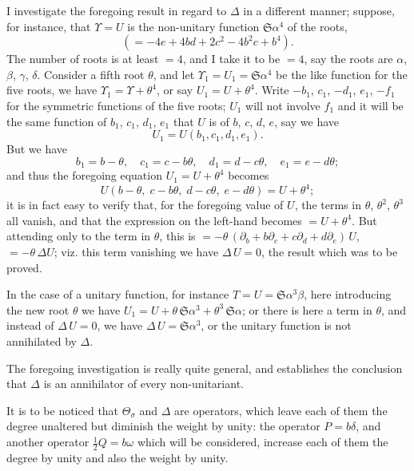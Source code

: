 \documentclass[11pt,a4paper]{book}
\begin{document}
\setcounter{art}{23}
\begin{art}
I investigate the foregoing result in regard to $\Delta$ in a different manner; suppose, for instance, that $\Upsilon = U$ is the non-unitary function $\mathfrak{S}\alpha^{4}$ of the roots,
\[
(= -4e + 4bd + 2c^{2} - 4b^{2}c + b^{4}).
\]
The number of roots is at least $= 4$, and I take it to be $= 4$, say the roots are $\alpha$, $\beta$, $\gamma$, $\delta$. Consider a fifth root $\theta$, and let $\Upsilon_{1} = U_{1} = \mathfrak{S}\alpha^{4}$ be the like function for the five roots, we have $\Upsilon_{1} = \Upsilon + \theta^{4}$, or say $U_{1} = U + \theta^{4}$. Write $-b_{1}$, $c_{1}$, $-d_{1}$, $e_{1}$, $-f_{1}$ for the symmetric functions of the five roots; $U_{1}$ will not involve $f_{1}$ and it will be the same function of $b_{1}$, $c_{1}$, $d_{1}$, $e_{1}$ that $U$ is of $b$, $c$, $d$, $e$, say we have
\[
U_{1} = U(b_{1}, c_{1}, d_{1}, e_{1}).
\]
But we have
\[
b_{1} = b - \theta,\quad c_{1} = c - b\theta,\quad d_{1} = d - c\theta,\quad e_{1} = e - d\theta;
\]
and thus the foregoing equation $U_{1} = U + \theta^{4}$ becomes
\[
U(b - \theta,\; c - b\theta,\; d - c\theta,\; e - d\theta) = U + \theta^{4};
\]
it is in fact easy to verify that, for the foregoing value of $U$, the terms in $\theta$, $\theta^{2}$, $\theta^{3}$ all vanish, and that the expression on the left-hand becomes $= U + \theta^{4}$. But attending only to the term in $\theta$, this is $= -\theta\,(\partial_{b} + b\partial_{c} + c\partial_{d} + d\partial_{e})\,U$, $= -\theta\,\Delta U$; viz. this term vanishing we have $\Delta\,U = 0$, the result which was to be proved.

In the case of a unitary function, for instance $T = U = \mathfrak{S}\alpha^{3}\beta$, here introducing the new root $\theta$ we have $U_{1} = U + \theta\,\mathfrak{S}\alpha^{3} + \theta^{3}\,\mathfrak{S}\alpha$; or there is here a term in $\theta$, and instead of $\Delta\,U = 0$, we have $\Delta\,U = \mathfrak{S}\alpha^{3}$, or the unitary function is not annihilated by $\Delta$.

The foregoing investigation is really quite general, and establishes the conclusion that $\Delta$ is an annihilator of every non-unitariant.

It is to be noticed that $\Theta_{\sigma}$ and $\Delta$ are operators, which leave each of them the degree unaltered but diminish the weight by unity: the operator $P = b\delta$, and another operator $\frac{1}{2}Q = b\omega$ which will be considered, increase each of them the degree by unity and also the weight by unity.
\end{art}
\end{document}
